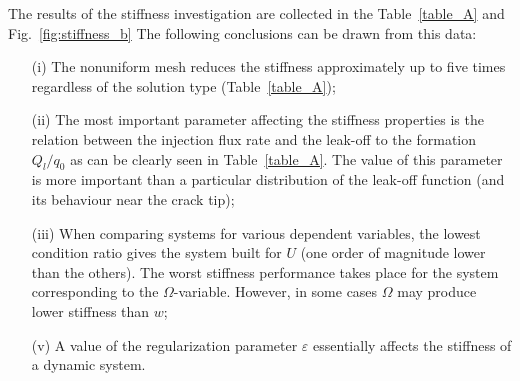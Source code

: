 The results of the stiffness investigation are collected in the
Table~\ref{table_A} and Fig.~\ref{fig:stiffness_b} The following
conclusions can be drawn from this data:






\begin{itemize}
\item [(i)] The nonuniform mesh reduces the stiffness approximately up to five times
regardless of the solution type (Table~\ref{table_A});

\item [(ii)] The most important parameter affecting the stiffness properties is the relation between
the injection flux rate and the leak-off to the formation $Q_l/q_0$ as can be clearly seen in
Table~\ref{table_A}. The value of this parameter is more important
than a particular distribution of the leak-off function (and its behaviour near the crack tip);


\item [(iii)] When comparing systems for various dependent variables,
the lowest condition ratio gives the system built for $U$ (one
order of magnitude lower than the others). The worst
stiffness performance takes place for the system corresponding to the
$\Omega$-variable. However, in some cases $\Omega$ may produce lower stiffness than $w$;

\item [(v)] A value of the regularization parameter $\varepsilon$
essentially affects  the stiffness of a dynamic system.
\end{itemize}